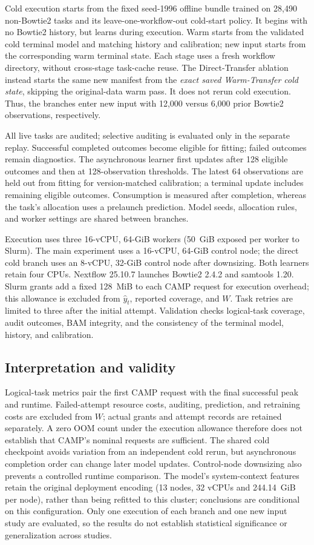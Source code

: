 Cold execution starts from the fixed seed-1996 offline bundle trained on
28,490 non-Bowtie2 tasks and its leave-one-workflow-out cold-start policy.
It begins with no Bowtie2 history, but learns during execution. Warm starts
from the validated cold terminal model and matching history and calibration;
new input starts from the corresponding warm terminal state. Each stage
uses a fresh workflow directory, without cross-stage task-cache reuse.
The Direct-Transfer ablation instead starts the same new manifest from the
\emph{exact saved Warm-Transfer cold state}, skipping the original-data warm pass.
It does not rerun cold execution. Thus, the branches enter new input with
12,000 versus 6,000 prior Bowtie2 observations, respectively.

All live tasks are audited; selective auditing is evaluated only in the
separate replay. Successful completed outcomes become eligible for fitting;
failed outcomes remain diagnostics. The asynchronous learner first updates
after 128 eligible outcomes and then at 128-observation thresholds. The
latest 64 observations are held out from fitting for version-matched
calibration; a terminal update includes remaining eligible outcomes.
Consumption is measured after completion, whereas the task's allocation
uses a prelaunch prediction. Model seeds, allocation rules, and worker
settings are shared between branches.

Execution uses three 16-vCPU, 64-GiB workers (50~GiB exposed per worker to
Slurm). The main experiment uses a 16-vCPU, 64-GiB control node; the direct
cold branch uses an 8-vCPU, 32-GiB control node after downsizing. Both learners
retain four CPUs. Nextflow 25.10.7 launches Bowtie2 2.4.2 and samtools 1.20.
Slurm grants add a fixed 128~MiB to each CAMP request for execution overhead;
this allowance is excluded from $\hat y_t$, reported coverage, and $W$.
Task retries are limited to three after the initial attempt. Validation
checks logical-task coverage, audit outcomes, BAM integrity, and the
consistency of the terminal model, history, and calibration.

\subsection{Interpretation and validity}
Logical-task metrics pair the first CAMP request with the final successful
peak and runtime. Failed-attempt resource costs, auditing, prediction, and
retraining costs are excluded from $W$; actual grants and attempt records
are retained separately. A zero OOM count under the execution allowance
therefore does not establish that CAMP's nominal requests are sufficient.
The shared cold checkpoint avoids variation from an independent cold
rerun, but asynchronous completion order can change later model updates.
Control-node downsizing also prevents a controlled runtime comparison.
The model's system-context features retain the original deployment encoding
(13 nodes, 32 vCPUs and 244.14~GiB per node), rather than being refitted to
this cluster; conclusions are conditional on this configuration.
Only one execution of each branch and one new input study are evaluated,
so the results do not establish statistical significance or generalization
across studies.
